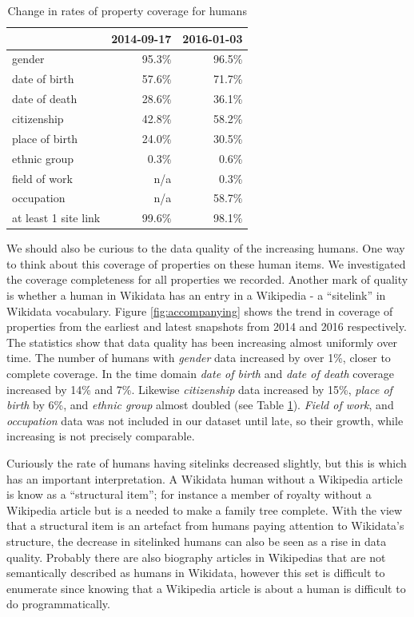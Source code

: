 \documentclass[letterpaper]{article}
\begin{document}
\begin{table}
\caption{Change in rates of property coverage for humans}
\begin{tabular}{lrr}
\toprule
{} &  2014-09-17 &  2016-01-03 \\
\midrule
gender               &       95.3\% &       96.5\% \\
date of birth        &       57.6\% &       71.7\% \\
date of death        &       28.6\% &       36.1\% \\
citizenship          &       42.8\% &       58.2\% \\
place of birth       &       24.0\% &       30.5\% \\
ethnic group         &        0.3\% &        0.6\% \\
field of work        &        n/a &        0.3\% \\
occupation           &        n/a &       58.7\% \\
at least 1 site link &       99.6\% &       98.1\% \\
\bottomrule
\end{tabular}
\label{table:accompanying}
\end{table}

We should also be curious to the data quality of the increasing humans. One way to think about this coverage of properties on these human items. We investigated the coverage completeness for all  properties we recorded. Another mark of quality is whether a human in Wikidata has an entry in a Wikipedia - a ``sitelink'' in Wikidata vocabulary. Figure \ref{fig:accompanying} shows the trend in coverage of properties from the earliest and latest snapshots from 2014 and 2016 respectively. The statistics show that data quality has been increasing almost uniformly over time. The number of humans with \textit{gender} data increased by over 1\%, closer to complete coverage. In the time domain \textit{date of birth} and \textit{date of death} coverage increased by 14\% and 7\%. Likewise \textit{citizenship} data increased by 15\%, \textit{place of birth} by 6\%, and \textit{ethnic group} almost doubled (see Table \ref{table:accompanying}). \textit{Field of work}, and \textit{occupation} data was not included in our dataset until late, so their growth, while increasing is not precisely comparable.

Curiously the rate of humans having sitelinks decreased slightly, but this is which has an important interpretation. A Wikidata human without a Wikipedia article is know as a ``structural item''; for instance a member of royalty without a Wikipedia article but is a needed to make a family tree complete. With the view that a structural item is an artefact from humans paying attention to Wikidata's structure, the decrease in sitelinked humans can also be seen as a rise in data quality. Probably there are also biography articles in Wikipedias that are not semantically described as humans in Wikidata, however this set is difficult to enumerate since knowing that a Wikipedia article is about a human is difficult to do programmatically. 
\end{document}
